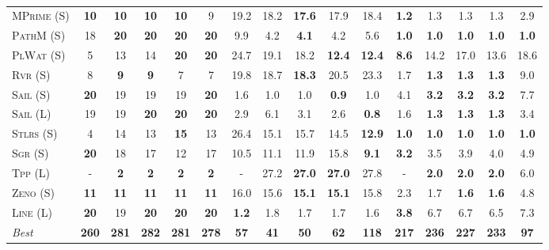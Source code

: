 \documentclass[11pt,landscape]{article}
\begin{document}
\begin{table}[tb]
{\begin{tabular}{|l||ccccc||ccccc||ccccc||}
\textsc{MPrime} (S)&\textbf{10}&\textbf{10}&\textbf{10}&\textbf{10}&9&19.2&18.2&\textbf{17.6}&17.9&18.4&\textbf{1.2}&1.3&1.3&1.3&2.9\\
\textsc{PathM} (S)&18&\textbf{20}&\textbf{20}&\textbf{20}&\textbf{20}&9.9&4.2&\textbf{4.1}&4.2&5.6&\textbf{1.0}&\textbf{1.0}&\textbf{1.0}&\textbf{1.0}&\textbf{1.0}\\
\textsc{PlWat} (S)&5&13&14&\textbf{20}&\textbf{20}&24.7&19.1&18.2&\textbf{12.4}&\textbf{12.4}&\textbf{8.6}&14.2&17.0&13.6&18.6\\
\textsc{Rvr} (S)&8&\textbf{9}&\textbf{9}&7&7&19.8&18.7&\textbf{18.3}&20.5&23.3&1.7&\textbf{1.3}&\textbf{1.3}&\textbf{1.3}&9.0\\
\textsc{Sail} (S)&\textbf{20}&19&19&19&\textbf{20}&1.6&1.0&1.0&\textbf{0.9}&1.0&4.1&\textbf{3.2}&\textbf{3.2}&\textbf{3.2}&7.7\\
\textsc{Sail} (L)&19&19&\textbf{20}&\textbf{20}&\textbf{20}&2.9&6.1&3.1&2.6&\textbf{0.8}&1.6&\textbf{1.3}&\textbf{1.3}&\textbf{1.3}&3.4\\
\textsc{Stlrs} (S)&4&14&13&\textbf{15}&13&26.4&15.1&15.7&14.5&\textbf{12.9}&\textbf{1.0}&\textbf{1.0}&\textbf{1.0}&\textbf{1.0}&\textbf{1.0}\\
\textsc{Sgr} (S)&\textbf{20}&18&17&12&17&10.5&11.1&11.9&15.8&\textbf{9.1}&\textbf{3.2}&3.5&3.9&4.0&4.9\\
\textsc{Tpp} (L)&-&\textbf{2}&\textbf{2}&\textbf{2}&\textbf{2}&-&27.2&\textbf{27.0}&\textbf{27.0}&27.8&-&\textbf{2.0}&\textbf{2.0}&\textbf{2.0}&6.0\\
\textsc{Zeno} (S)&\textbf{11}&\textbf{11}&\textbf{11}&\textbf{11}&\textbf{11}&16.0&15.6&\textbf{15.1}&\textbf{15.1}&15.8&2.3&1.7&\textbf{1.6}&\textbf{1.6}&4.8\\
\textsc{Line} (L)&\textbf{20}&19&\textbf{20}&\textbf{20}&\textbf{20}&\textbf{1.2}&1.8&1.7&1.7&1.6&\textbf{3.8}&6.7&6.7&6.5&7.3
\\\hline
\textit{Best}&\textbf{260}&\textbf{281}&\textbf{282}&\textbf{281}&\textbf{278}&\textbf{57}&\textbf{41}&\textbf{50}&\textbf{62}&\textbf{118}&\textbf{217}&\textbf{236}&\textbf{227}&\textbf{233}&\textbf{97}\\\hline

        \end{tabular}}
        \caption{}
        \label{tab:table-1}
        \end{table}
        
\end{document}
